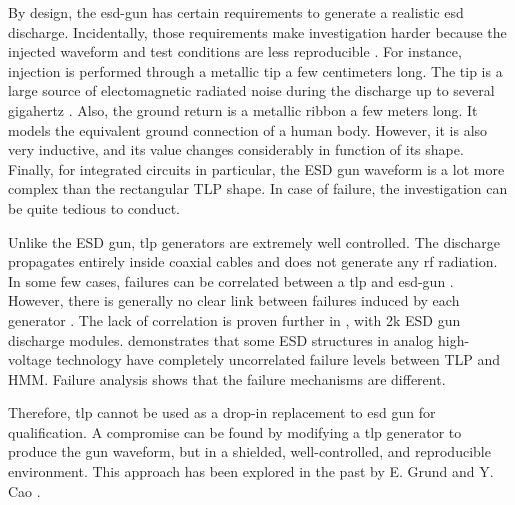 By design, the \gls{esd-gun} has certain requirements to generate a realistic \gls{esd} discharge.
Incidentally, those requirements make investigation harder because the injected waveform and test conditions are less reproducible \cite{hmm-round-robin-study}.
For instance, injection is performed through a metallic tip a few centimeters long.
The tip is a large source of electomagnetic radiated noise during the discharge up to several gigahertz \cite{system-level-esd-failure-variation}.
Also, the ground return is a metallic ribbon a few meters long.
It models the equivalent ground connection of a human body.
However, it is also very inductive, and its value changes considerably in function of its shape.
Finally, for integrated circuits in particular, the ESD gun waveform is a lot more complex than the rectangular TLP shape.
In case of failure, the investigation can be quite tedious to conduct.

Unlike the ESD gun, \gls{tlp} generators are extremely well controlled.
The discharge propagates entirely inside coaxial cables and does not generate any \gls{rf} radiation.
In some few cases, failures can be correlated between a \gls{tlp} and \gls{esd-gun} \cite{correlation-system-level-esd-tlp}.
However, there is generally no clear link between failures induced by each generator \cite{miscorrelation-esd-hmm}.
The lack of correlation is proven further in \cite{correlation-system-level-esd-tlp}, with 2k\textOmega{} ESD gun discharge modules.
\cite{correlation-system-level-esd-tlp} demonstrates that some ESD structures in analog high-voltage technology have completely uncorrelated failure levels between TLP and HMM. Failure analysis shows that the failure mechanisms are different.

Therefore, \gls{tlp} cannot be used as a drop-in replacement to \gls{esd} gun for qualification.
A compromise can be found by modifying a \gls{tlp} generator to produce the gun waveform, but in a shielded, well-controlled, and reproducible environment.
This approach has been explored in the past by E. Grund \cite{iec61000-tlp} and Y. Cao \cite{tlp-based-hmm}.

